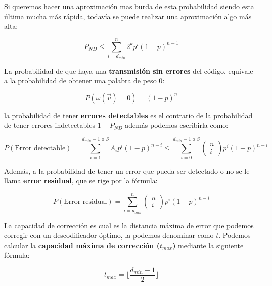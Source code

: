 \documentclass{article}
\begin{document}
Si queremos hacer una aproximación mas burda de esta probabilidad siendo esta última mucha más rápida, todavía se puede realizar una aproximación algo más alta:

\begin{equation}
    P_{ND} \leq \sum_{i=d_{min}}^{n} 2^kp^i(1-p)^{n-1}
\end{equation}

La probabilidad de que haya una \textbf{transmisión sin errores} del código, equivale a la probabilidad de obtener una palabra de peso 0:


\begin{equation}
    P(\omega (\vec{v}) = 0) = (1-p)^n
\end{equation}

la probabilidad de tener \textbf{errores detectables} es el contrario de la probabilidad de tener errores indetectables $1-P_{ND}$ además podemos escribirla como:

\begin{equation}
    P(\text{Error detectable}) =
    \sum_{i=1}^{d_{min}-1\text{ o }S}A_ip^i(1-p)^{n-i} \leq
    \sum_{i=0}^{d_{min}-1\text{ o }S}
    \left(\begin{array}{c}
        n \\
        i    
    \end{array}\right)
    p^i(1-p)^{n-i}
\end{equation}

Además, a la probabilidad de tener un error que pueda ser detectado o no se le llama \textbf{error residual}, que se rige por la fórmula:

\begin{equation}
    P(\text{Error residual}) = \sum_{i=d_{min}}^{n}
    \left(\begin{array}{c}
        n \\
        i    
    \end{array}\right)
    p^i(1-p)^{n-i}
\end{equation}

La capacidad de corrección es cual es la distancia máxima de error que podemos corregir con un descodificador óptimo, la podemos denominar como $t$. Podemos calcular la \textbf{capacidad máxima de corrección ($t_{max}$)} mediante la siguiente fórmula:

\begin{equation}
    t_{max} = 
    \big\lfloor
        \frac{d_{min}-1}{2}
    \big\rfloor
\end{equation}
\end{document}
